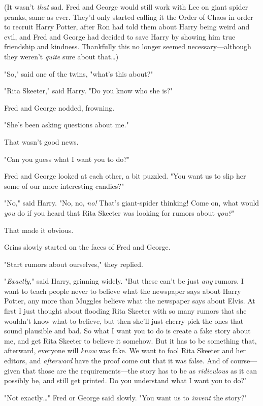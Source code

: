 (It wasn't \emph{that} sad. Fred and George would still work with Lee on giant
spider pranks, same as ever. They'd only started calling it the Order of Chaos
in order to recruit Harry Potter, after Ron had told them about Harry being
weird and evil, and Fred and George had decided to save Harry by showing him
true friendship and kindness. Thankfully this no longer seemed
necessary---although they weren't \emph{quite} sure about that{\ldots})

"So," said one of the twins, "what's this about?"

"Rita Skeeter," said Harry. "Do you know who she is?"

Fred and George nodded, frowning.

"She's been asking questions about me."

That wasn't good news.

"Can you guess what I want you to do?"

Fred and George looked at each other, a bit puzzled. "You want us to slip her
some of our more interesting candies?"

"No," said Harry. "No, no, \emph{no!} That's giant-spider thinking! Come on,
what would \emph{you} do if you heard that Rita Skeeter was looking for rumors
about \emph{you?}"

That made it obvious.

Grins slowly started on the faces of Fred and George.

"Start rumors about ourselves," they replied.

"\emph{Exactly,}" said Harry, grinning widely. "But these can't be just
\emph{any} rumors. I want to teach people never to believe what the newspaper
says about Harry Potter, any more than Muggles believe what the newspaper says
about Elvis. At first I just thought about flooding Rita Skeeter with so many
rumors that she wouldn't know what to believe, but then she'll just cherry-pick
the ones that sound plausible and bad. So what I want you to do is create a
fake story about me, and get Rita Skeeter to believe it somehow. But it has to
be something that, afterward, everyone will \emph{know} was fake. We want to
fool Rita Skeeter and her editors, and \emph{afterward} have the proof come out
that it was false. And of course---given that those are the requirements---the
story has to be as \emph{ridiculous} as it can possibly be, and still get
printed. Do you understand what I want you to do?"

"Not exactly{\ldots}" Fred or George said slowly. "You want us to \emph{invent}
the story?"

